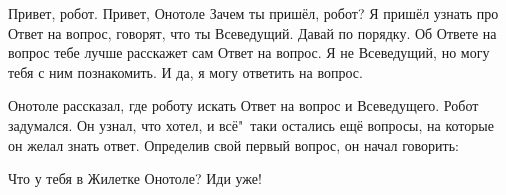 \begin{dialog}
\X Привет, робот.
\R Привет, Онотоле
\X Зачем ты пришёл, робот?
\R Я пришёл узнать про Ответ на вопрос, говорят, что ты Всеведущий.
\X Давай по порядку. Об Ответе на вопрос тебе лучше расскажет сам Ответ на вопрос. Я не Всеведущий, но могу тебя с ним познакомить. И да, я могу ответить на вопрос.
\end{dialog}

\begin{monolog}
Онотоле рассказал, где роботу искать Ответ на вопрос и Всеведущего. Робот задумался. Он узнал, что хотел, и всё"~таки остались ещё вопросы, на которые он желал знать ответ. Определив свой первый вопрос, он начал говорить:
\end{monolog}

\begin{dialog}
\X Что у тебя в Жилетке Онотоле?
\R Иди уже!
\end{dialog}